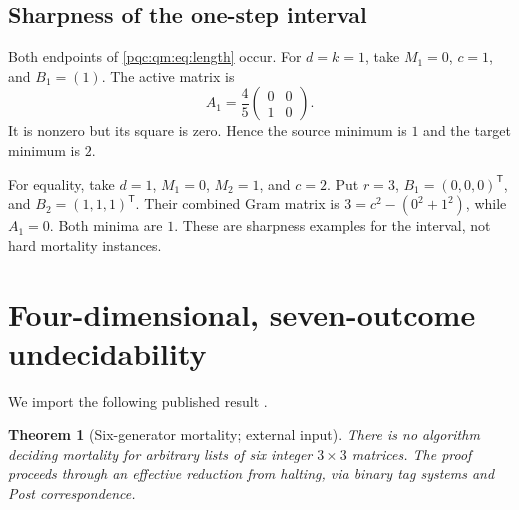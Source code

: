 \documentclass[11pt,letterpaper]{article}
\numberwithin{equation}{section}
\newtheorem{theorem}{Theorem}[section]
\theoremstyle{definition}
\theoremstyle{remark}
\begin{document}
\subsection{Sharpness of the one-step interval}

Both endpoints of \eqref{pqc:qm:eq:length} occur. For $d=k=1$, take $M_1=0$, $c=1$, and $B_1=(1)$. The active matrix is
\[
 A_1=\frac45\begin{pmatrix}0&0\\1&0\end{pmatrix}.
\]
It is nonzero but its square is zero. Hence the source minimum is $1$ and the target minimum is $2$.

For equality, take $d=1$, $M_1=0$, $M_2=1$, and $c=2$. Put $r=3$, $B_1=(0,0,0)^{\mathsf T}$, and $B_2=(1,1,1)^{\mathsf T}$. Their combined Gram matrix is $3=c^2-(0^2+1^2)$, while $A_1=0$. Both minima are $1$. These are sharpness examples for the interval, not hard mortality instances.

\section{Four-dimensional, seven-outcome undecidability}
\label{pqc:qm:sec:hardness}

We import the following published result \cite[Corollary 12]{neary}.

\begin{theorem}[Six-generator mortality; external input]
\label{pqc:qm:thm:source}
There is no algorithm deciding mortality for arbitrary lists of six integer $3\times3$ matrices. The proof proceeds through an effective reduction from halting, via binary tag systems and Post correspondence.
\end{theorem}
\end{document}
